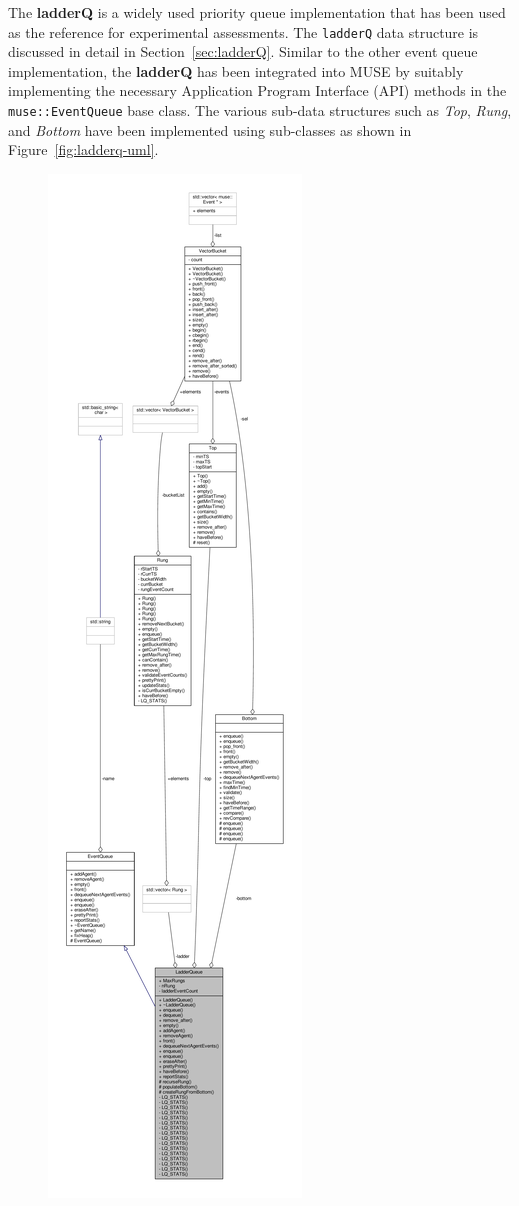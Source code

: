 The \textbf{ladderQ} is a widely used priority queue implementation
that has been used as the reference for experimental assessments.  The
\texttt{ladderQ} data structure is discussed in detail in
Section~\ref{sec:ladderQ}.  Similar to the other event queue
implementation, the \textbf{ladderQ} has been integrated into MUSE by
suitably implementing the necessary Application Program Interface
(API) methods in the \texttt{muse::EventQueue} base class.  The
various sub-data structures such as \emph{Top}, \emph{Rung}, and
\emph{Bottom} have been implemented using sub-classes as shown in
Figure~\ref{fig:ladderq-uml}.

\begin{figure}
  \centerline{\includegraphics[height=0.85\textheight]{images/collab_diags/LadderQueue.pdf}}

\end{figure}
